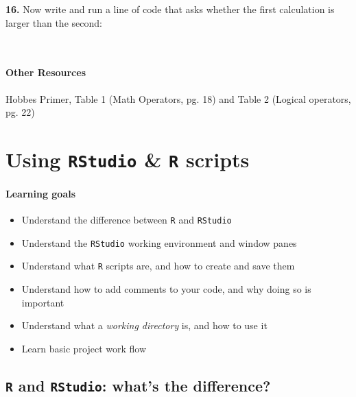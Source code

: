 \documentclass[
]{book}
\providecommand{\tightlist}{%
  \setlength{\itemsep}{0pt}\setlength{\parskip}{0pt}}
\begin{document}
\textbf{16.} Now write and run a line of code that asks whether the first calculation is larger than the second:

~

\hypertarget{other-resources}{%
\subsubsection*{Other Resources}\label{other-resources}}

Hobbes Primer, Table 1 (Math Operators, pg. 18) and Table 2 (Logical operators, pg. 22)

\hypertarget{using-rstudio-r-scripts}{%
\chapter{\texorpdfstring{Using \texttt{RStudio} \& \texttt{R} scripts}{Using RStudio \& R scripts}}\label{using-rstudio-r-scripts}}

\hypertarget{learning-goals-1}{%
\subsubsection*{Learning goals}\label{learning-goals-1}}

\begin{itemize}
\tightlist
\item
  Understand the difference between \texttt{R} and \texttt{RStudio}
\item
  Understand the \texttt{RStudio} working environment and window panes\\
\item
  Understand what \texttt{R} scripts are, and how to create and save them
\item
  Understand how to add comments to your code, and why doing so is important
\item
  Understand what a \emph{working directory} is, and how to use it
\item
  Learn basic project work flow
\end{itemize}

\hypertarget{r-and-rstudio-whats-the-difference}{%
\section*{\texorpdfstring{\texttt{R} and \texttt{RStudio}: what's the difference?}{R and RStudio: what's the difference?}}\label{r-and-rstudio-whats-the-difference}}
\end{document}
